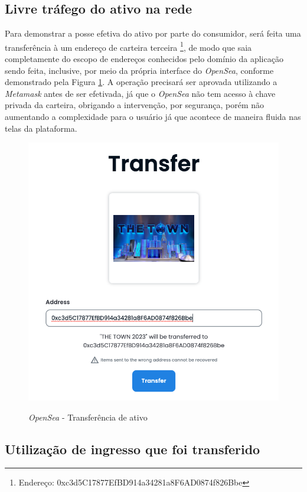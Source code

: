 {\subsection{\esp Livre tráfego do ativo na rede}

Para demonstrar a posse efetiva do ativo por parte do consumidor, será feita uma transferência à um endereço de carteira terceira \footnote{Endereço: 0xc3d5C17877EfBD914a34281a8F6AD0874f826Bbe}, de modo que saia completamente do escopo de endereços conhecidos pelo domínio da aplicação sendo feita, inclusive, por meio da própria interface do \textit{OpenSea}, conforme demonstrado pela Figura \ref{fig:opensea-transfer}. A operação precisará ser aprovada utilizando a \textit{Metamask} antes de ser efetivada, já que o \textit{OpenSea} não tem acesso à chave privada da carteira, obrigando a intervenção, por segurança, porém não aumentando a complexidade para o usuário já que acontece de maneira fluida nas telas da plataforma.

\begin{figure}[ht]
    \centering
    \caption{\textit{OpenSea} - Transferência de ativo}
    \includegraphics[scale=0.25]{figuras/opensea-transfer.png}
    \label{fig:opensea-transfer}
\end{figure}
    
\subsection{\esp Utilização de ingresso que foi transferido}

}
